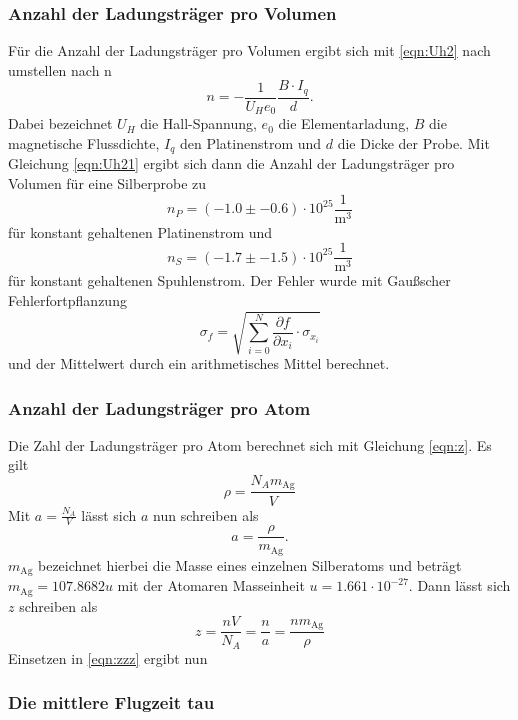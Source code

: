     \subsubsection{Anzahl der Ladungsträger pro Volumen}
        Für die Anzahl der Ladungsträger pro Volumen ergibt sich mit \ref{eqn:Uh2} nach umstellen nach n
        \begin{equation}
            n=-\frac{1}{U_{H} e_0}\frac{B\cdot I_q}{d}. \label{eqn:Uh21}
          \end{equation}
          Dabei bezeichnet $U_{H}$ die Hall-Spannung, $e_{0}$ die Elementarladung, $B$ die magnetische Flussdichte, $I_{q}$ den Platinenstrom und $d$ die Dicke
          der Probe. Mit Gleichung \ref{eqn:Uh21} ergibt sich dann die Anzahl der Ladungsträger pro Volumen für eine Silberprobe zu
          \begin{equation}
            n_{P} = (-1.0 \pm -0.6) \cdot 10^{25} \frac{1}{\si{\cubic\meter}}
          \end{equation}
          für konstant gehaltenen Platinenstrom und
          \begin{equation}
            n_{S} = (-1.7 \pm -1.5) \cdot 10^{25} \frac{1}{\si{\cubic\meter}}
          \end{equation}
        für konstant gehaltenen Spuhlenstrom.
        Der Fehler wurde mit Gaußscher Fehlerfortpflanzung
        \begin{equation}
          \sigma_f = \sqrt{\sum_{i=0}^{N} {\frac{\partial f}{\partial x_i} \cdot \sigma_{x_i}}}
          \label{eqn:gauss}
        \end{equation}
        und der Mittelwert durch ein arithmetisches Mittel berechnet.
    \subsubsection{Anzahl der Ladungsträger pro Atom}
        Die Zahl der Ladungsträger pro Atom berechnet sich mit Gleichung \ref{eqn:z}. Es gilt
        \begin{equation*}
          \rho = \frac{N_{A} m_\text{Ag}}{V}
        \end{equation*}
        Mit $a = \frac{N_{A}}{V}$ lässt sich $a$ nun schreiben als
        \begin{equation*}
          a = \frac{\rho}{m_\text{Ag}}.
        \end{equation*}
        $m_\text{Ag}$ bezeichnet hierbei die Masse eines einzelnen Silberatoms und beträgt $m_\text{Ag} = 107.8682u$ mit
        der Atomaren Masseinheit $u = 1.661 \cdot 10^{-27}$. Dann lässt sich $z$ schreiben als
        \begin{equation}
          z =\frac{n V}{N_A} = \frac{n}{a} = \frac{n m_\text{Ag}}{\rho}
          \label{eqn:zzz}
        \end{equation}
        Einsetzen in \ref{eqn:zzz} ergibt nun

    \subsubsection{Die mittlere Flugzeit tau}

  \label{sec:Auswertung}
